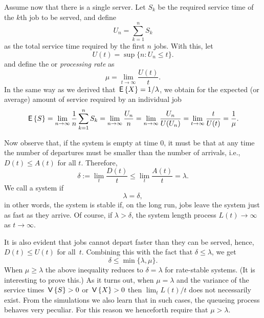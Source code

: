 Assume now that there is a single server. Let $S_k$ be the required
service time of the $k$th job to be served, and define
\begin{equation*}
U_n = \sum_{k=1}^n S_k
\end{equation*}
as the total service time required by the first $n$ jobs. With this,
let 
\begin{equation*}
  U(t) = \sup\{n: U_n \leq t\}.
\end{equation*}
and  define the  or \emph{processing rate} as
\begin{equation*}
  \mu = \lim_{t\to\infty} \frac{U(t)}t.
\end{equation*}
In the same way as we derived that $\,\mathsf{E}\left\{X\right\}= 1/\lambda$, we obtain for
the expected (or average) amount of service required by an individual
job
\begin{equation*}
  \,\mathsf{E}\left\{S\right\} = \lim_{n\to\infty} \frac 1 n \sum_{k=1}^n S_k = \lim_{n\to\infty} \frac{U_n}{n} = \lim_{n\to\infty} \frac{U_n}{U(U_n)} = \lim_{t\to\infty} \frac t{U(t)} = \frac 1 \mu.
\end{equation*}

Now observe that, if the system is empty at time $0$, it must be that
at any time the number of departures must be smaller than the number
of arrivals, i.e., $D(t) \leq A(t)$ for all $t$. Therefore,
\begin{equation}\label{eq:26}
\delta :=   \lim_t \frac{D(t)}t \leq \lim_t \frac{A(t)}t = \lambda.
\end{equation}
We call a system  if
\begin{equation*}
  \lambda = \delta,
\end{equation*}
in other words, the system is stable if, on the long run, jobs leave
the system just as fast as they arrive. Of course, if
$\lambda > \delta$, the system length process $L(t) \to \infty$ as
$t\to \infty$.

It is also evident that jobs cannot depart faster than they can be
served, hence, $D(t) \leq U(t)$ for all~$t$. Combining this with the
fact that $\delta \leq \lambda$, we get
\begin{equation*}
  \delta \leq \min\{\lambda, \mu\}.
\end{equation*}
When $\mu \geq \lambda$ the above inequality reduces to
$\delta = \lambda$ for rate-stable systems. (It is interesting to
prove this.) As it turns out, when $\mu = \lambda$ and the variance of
the service times $\,\mathsf{V}\left\{S\right\} > 0$ or $\,\mathsf{V}\left\{X\right\} >0$ then $\lim_t L(t)/t$
does not necessarily exist. From the simulations we also learn that in such cases, the queueing process behaves very peculiar. For this reason we henceforth require that $\mu > \lambda$.




